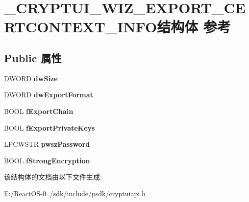 \hypertarget{struct___c_r_y_p_t_u_i___w_i_z___e_x_p_o_r_t___c_e_r_t_c_o_n_t_e_x_t___i_n_f_o}{}\section{\+\_\+\+C\+R\+Y\+P\+T\+U\+I\+\_\+\+W\+I\+Z\+\_\+\+E\+X\+P\+O\+R\+T\+\_\+\+C\+E\+R\+T\+C\+O\+N\+T\+E\+X\+T\+\_\+\+I\+N\+F\+O结构体 参考}
\label{struct___c_r_y_p_t_u_i___w_i_z___e_x_p_o_r_t___c_e_r_t_c_o_n_t_e_x_t___i_n_f_o}
\subsection*{Public 属性}
\begin{DoxyCompactItemize}
\item 
\mbox{\label{struct___c_r_y_p_t_u_i___w_i_z___e_x_p_o_r_t___c_e_r_t_c_o_n_t_e_x_t___i_n_f_o_a7a4635641a39dd7f6e13aedde1745ec3}} 
D\+W\+O\+RD {\bfseries dw\+Size}
\item 
\mbox{\label{struct___c_r_y_p_t_u_i___w_i_z___e_x_p_o_r_t___c_e_r_t_c_o_n_t_e_x_t___i_n_f_o_afd5429de710983328b00acd40475317f}} 
D\+W\+O\+RD {\bfseries dw\+Export\+Format}
\item 
\mbox{\label{struct___c_r_y_p_t_u_i___w_i_z___e_x_p_o_r_t___c_e_r_t_c_o_n_t_e_x_t___i_n_f_o_aff9b87073f1c5720837e471031558444}} 
B\+O\+OL {\bfseries f\+Export\+Chain}
\item 
\mbox{\label{struct___c_r_y_p_t_u_i___w_i_z___e_x_p_o_r_t___c_e_r_t_c_o_n_t_e_x_t___i_n_f_o_ae2683028de3cad2905982f08ae335a82}} 
B\+O\+OL {\bfseries f\+Export\+Private\+Keys}
\item 
\mbox{\label{struct___c_r_y_p_t_u_i___w_i_z___e_x_p_o_r_t___c_e_r_t_c_o_n_t_e_x_t___i_n_f_o_a33450287609feacee2fbb35cce3b97c8}} 
L\+P\+C\+W\+S\+TR {\bfseries pwsz\+Password}
\item 
\mbox{\label{struct___c_r_y_p_t_u_i___w_i_z___e_x_p_o_r_t___c_e_r_t_c_o_n_t_e_x_t___i_n_f_o_a6f57c962dd74e3ec9f3e2d7922c03b4a}} 
B\+O\+OL {\bfseries f\+Strong\+Encryption}
\end{DoxyCompactItemize}


该结构体的文档由以下文件生成\+:\begin{DoxyCompactItemize}
\item 
E\+:/\+React\+O\+S-\/0../sdk/include/psdk/cryptuiapi.\+h\end{DoxyCompactItemize}
